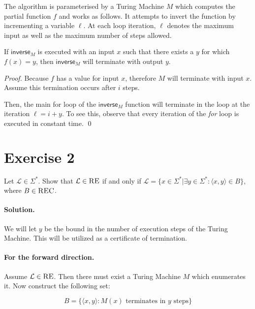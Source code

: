 \documentclass[11pt]{llncs}
\begin{document}
The algorithm is parameterised by a Turing Machine $M$ which computes
the partial function $f$ and works as follows. It attempts to invert the
function by incrementing a variable $\ell$. At each loop iteration, $\ell$
denotes the maximum input as well as the maximum number of steps allowed.

\begin{lemma}
If $\textsf{inverse}_M$ is executed with an input $x$ such that there exists
a $y$ for which $f(x) = y$, then $\textsf{inverse}_M$ will terminate with output
$y$.
\end{lemma}
\begin{proof}
Because $f$ has a value for input $x$, therefore $M$ will terminate with input
$x$. Assume this termination occurs after $i$ steps.

Then, the main for loop of the $\textsf{inverse}_M$ function will terminate in
the loop at the iteration $\ell = i + y$. To see this, observe that every
iteration of the \textit{for} loop is executed in constant time.
\qed
\end{proof}

\section*{Exercise 2}
Let $\mathcal{L} \in \Sigma^*$. Show that $\mathcal{L} \in \textsc{RE}$ if and
only if $\mathcal{L} = \{x \in \Sigma^*|\exists y \in \Sigma^*:
\langle x, y \rangle \in B\}$, where $B \in \textsc{REC}$.

\paragraph{Solution.}

We will let $y$ be the bound in the number of execution steps of
the Turing Machine. This will be utilized as a certificate of termination.

\paragraph{For the forward direction.} Assume $\mathcal{L} \in \textsc{RE}$. Then
there must exist a Turing Machine $M$ which enumerates it. Now construct the
following set:

\[
  B = \{\langle x, y \rangle: M(x) \text{ terminates in } y \text{ steps}\}
\]
\end{document}
